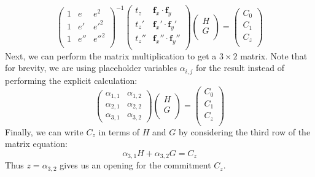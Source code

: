 \documentclass[10pt,a4paper]{article}
\begin{document}
\[
\begin{pmatrix}
1 & e & e^2 \\
1 & e' & e'^2 \\
1 & e'' & e''^2 \\
\end{pmatrix}^{-1}
\begin{pmatrix}
t_z & \textbf{f}_x \cdot \textbf{f}_y \\
t_z' & \textbf{f}_x' \cdot \textbf{f}_y' \\
t_z'' & \textbf{f}_x'' \cdot \textbf{f}_y'' \\
\end{pmatrix}
\begin{pmatrix}
H\\
G\\
\end{pmatrix}
=
\begin{pmatrix}
C_0\\
C_1\\
C_z\\
\end{pmatrix}
\]
Next, we can perform the matrix multiplication to get a $3 \times 2$ matrix. Note that for
brevity, we are using placeholder variables $\alpha_{i,j}$ for the result instead of
performing the explicit calculation:
\[
\begin{pmatrix}
\alpha_{1,1} & \alpha_{1,2} \\
\alpha_{2,1} & \alpha_{2,2} \\
\alpha_{3,1} & \alpha_{3,2}
\end{pmatrix}
\begin{pmatrix}
H\\
G\\
\end{pmatrix}
=
\begin{pmatrix}
C_0\\
C_1\\
C_z\\
\end{pmatrix}
\]
Finally, we can write $C_z$ in terms of $H$ and $G$ by considering the
third row of the matrix equation:
\[
\alpha_{3,1}H + \alpha_{3,2}G = C_z
\]
Thus $z = \alpha_{3,2}$ gives us an opening for the commitment $C_z$.
\end{document}
